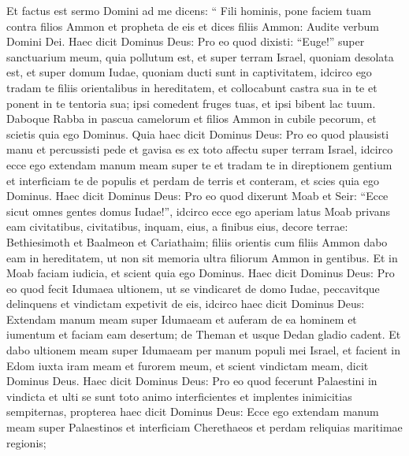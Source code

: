 \begin{biblechapter}
\begin{biblechapter}
\begin{biblechapter}
\begin{biblechapter}
\begin{biblechapter}
\begin{biblechapter}
\begin{biblechapter}
\begin{biblechapter}
\begin{biblechapter}
\begin{biblechapter}
\begin{biblechapter}
\begin{biblechapter}
\begin{biblechapter}
\begin{biblechapter}
\begin{biblechapter}
\begin{biblechapter}
\begin{biblechapter}
\begin{biblechapter}
\begin{biblechapter}
\begin{biblechapter}
\begin{biblechapter}
\begin{biblechapter}
\begin{biblechapter}
\begin{biblechapter}
\begin{biblechapter}
\verse Et factus est sermo Domini ad me dicens: 
\verse “ Fili hominis, pone faciem tuam contra filios Ammon et propheta de eis 
\verse et dices filiis Ammon: Audite verbum Domini Dei.
 Haec dicit Dominus Deus: Pro eo quod dixisti: “Euge!” super sanctuarium meum, quia pollutum est, et super terram Israel, quoniam desolata est, et super domum Iudae, quoniam ducti sunt in captivitatem, 
\verse idcirco ego tradam te filiis orientalibus in hereditatem, et collocabunt castra sua in te et ponent in te tentoria sua; ipsi comedent fruges tuas, et ipsi bibent lac tuum. 
\verse Daboque Rabba in pascua camelorum et filios Ammon in cubile pecorum, et scietis quia ego Dominus.
 \verse Quia haec dicit Dominus Deus: Pro eo quod plausisti manu et percussisti pede et gavisa es ex toto affectu super terram Israel, 
\verse idcirco ecce ego extendam manum meam super te et tradam te in direptionem gentium et interficiam te de populis et perdam de terris et conteram, et scies quia ego Dominus.
 \verse Haec dicit Dominus Deus: Pro eo quod dixerunt Moab et Seir: “Ecce sicut omnes gentes domus Iudae!”, 
\verse idcirco ecce ego aperiam latus Moab privans eam civitatibus, civitatibus, inquam, eius, a finibus eius, decore terrae: Bethiesimoth et Baalmeon et Cariathaim; 
\verse filiis orientis cum filiis Ammon dabo eam in hereditatem, ut non sit memoria ultra filiorum Ammon in gentibus. 
 \verse Et in Moab faciam iudicia, et scient quia ego Dominus.
 \verse Haec dicit Dominus Deus: Pro eo quod fecit Idumaea ultionem, ut se vindicaret de domo Iudae, peccavitque delinquens et vindictam expetivit de eis, 
\verse idcirco haec dicit Dominus Deus: Extendam manum meam super Idumaeam et auferam de ea hominem et iumentum et faciam eam desertum; de Theman et usque Dedan gladio cadent. 
\verse Et dabo ultionem meam super Idumaeam per manum populi mei Israel, et facient in Edom iuxta iram meam et furorem meum, et scient vindictam meam, dicit Dominus Deus.
 \verse Haec dicit Dominus Deus: Pro eo quod fecerunt Palaestini in vindicta et ulti se sunt toto animo interficientes et implentes inimicitias sempiternas, 
\verse propterea haec dicit Dominus Deus: Ecce ego extendam manum meam super Palaestinos et interficiam Cherethaeos et perdam reliquias maritimae regionis; 

\end{biblechapter}
\end{biblechapter}
\end{biblechapter}
\end{biblechapter}
\end{biblechapter}
\end{biblechapter}
\end{biblechapter}
\end{biblechapter}
\end{biblechapter}
\end{biblechapter}
\end{biblechapter}
\end{biblechapter}
\end{biblechapter}
\end{biblechapter}
\end{biblechapter}
\end{biblechapter}
\end{biblechapter}
\end{biblechapter}
\end{biblechapter}
\end{biblechapter}
\end{biblechapter}
\end{biblechapter}
\end{biblechapter}
\end{biblechapter}
\end{biblechapter}
